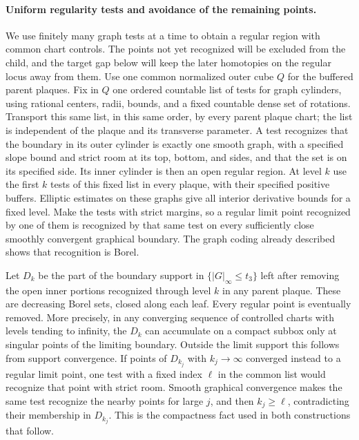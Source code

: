 \paragraph{Uniform regularity tests and avoidance of the remaining points.}
We use finitely many graph tests at a time to obtain a regular region
with common chart controls.  The points not yet recognized will be
excluded from the child, and the target gap below will keep the later
homotopies on the regular locus away from them.
Use one common normalized outer cube $Q$ for the buffered parent plaques.
Fix in $Q$ one ordered countable list of tests for graph cylinders, using
rational centers, radii, bounds, and a fixed countable dense set of
rotations.  Transport this same list, in this same order, by every parent
plaque chart; the list is independent of the plaque and its transverse
parameter.  A test recognizes that the boundary
in its outer cylinder is exactly one smooth graph, with a specified slope
bound and strict room at its top, bottom, and sides, and that the set is
on its specified side.  Its inner cylinder is then an open regular
region.  At level $k$ use the first $k$ tests of this fixed list in every
plaque, with their specified positive buffers.  Elliptic estimates on these
graphs give all interior derivative bounds for a fixed level.  Make the
tests with strict margins, so a regular limit point recognized by one of
them is recognized by that same test on every sufficiently close smoothly
convergent graphical boundary.  The graph coding already described shows
that recognition is Borel.

Let $D_k$ be the part of the boundary support in
$\{|G|_\infty\le t_3\}$ left after removing the open inner portions
recognized through level $k$ in any parent plaque.  These are decreasing
Borel sets, closed along each leaf.  Every regular point is eventually
removed.  More precisely, in any converging sequence of controlled
charts with levels tending to infinity, the $D_k$ can accumulate on a
compact subbox only at singular points of the limiting boundary.
Outside the limit support this follows from support convergence.  If
points of $D_{k_j}$ with $k_j\to\infty$ converged instead to a regular
limit point, one test with a fixed index $\ell$ in the common list would
recognize that point with strict room.  Smooth graphical convergence
makes the same test recognize the nearby points for large $j$, and then
$k_j\ge\ell$, contradicting their membership in $D_{k_j}$.  This is the
compactness fact used in both constructions that follow.

